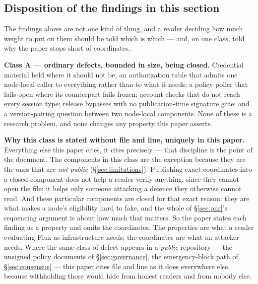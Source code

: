 \subsection{Disposition of the findings in this section}
\label{sec:14-disposition}

The findings above are not one kind of thing, and a reader deciding how much weight to put on them
should be told which is which --- and, on one class, told why the paper stops short of coordinates.

\textbf{Class A --- ordinary defects, bounded in size, being closed.} Credential material held
where it should not be; an authorization table that admits one node-local caller to everything
rather than to what it needs; a policy poller that fails open where its counterpart fails frozen;
account checks that do not reach every session type; release bypasses with no publication-time
signature gate; and a version-pairing question between two node-local components. None of these is
a research problem, and none changes any property this paper asserts. 

\textbf{Why this class is stated without file and line, uniquely in this paper.} Everything else
this paper cites, it cites precisely --- that discipline is the point of the document. The
components in this class are the exception because they are the ones that are \emph{not public}
(\S\ref{sec:limitations}). Publishing exact coordinates into a closed component does not help a
reader verify anything, since they cannot open the file; it helps only someone attacking a defence
they otherwise cannot read. And these particular components are closed for that exact reason: they
are what makes a node's eligibility hard to fake, and the whole of \S\ref{sec:pnr}'s sequencing
argument is about how much that matters. So the paper states each finding as a property and omits
the coordinates. The properties are what a reader evaluating Flux as infrastructure needs; the
coordinates are what an attacker needs. Where the same class of defect appears in a \emph{public}
repository --- the unsigned policy documents of \S\ref{sec:governance}, the emergency-block path of
\S\ref{sec:consensus} --- this paper cites file and line as it does everywhere else, because
withholding those would hide from honest readers and from nobody else.

